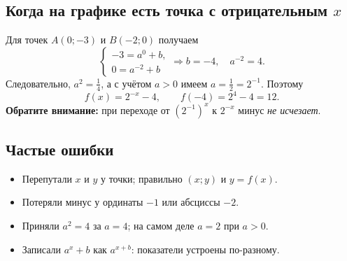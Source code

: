 \documentclass[a4paper,12pt]{article}
\begin{document}
\subsection*{Когда на графике есть точка с отрицательным $x$}
Для точек $A(0;-3)$ и $B(-2;0)$ получаем
\[
\begin{cases}
-3=a^0+b,\\0=a^{-2}+b
\end{cases}
\Longrightarrow b=-4,\quad a^{-2}=4.
\]
Следовательно, $a^2=\frac14$, а с учётом $a>0$ имеем $a=\frac12=2^{-1}$. Поэтому
\[
 f(x)=2^{-x}-4,\qquad f(-4)=2^4-4=12.
\]
\textbf{Обратите внимание:} при переходе от $(2^{-1})^x$ к $2^{-x}$ минус \emph{не исчезает}.

\subsection*{Частые ошибки}
\begin{itemize}
\item Перепутали $x$ и $y$ у точки; правильно $\left(x;y\right)$ и $y=f(x)$.
\item Потеряли минус у ординаты $-1$ или абсциссы $-2$.
\item Приняли $a^2=4$ за $a=4$; на самом деле $a=2$ при $a>0$.
\item Записали $a^{x}+b$ как $a^{x+b}$: показатели устроены по-разному.
\end{itemize}

\clearpage
\end{document}

